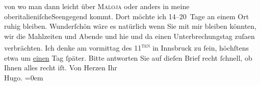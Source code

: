 \begin{ledgroupsized}[t]{13cm}
                    von wo man dann leicht über \textsc{Maloja} oder anders {\pb}in meine oberitalieniſcheSeengegend kommt. Dort möchte ich 14–20 Tage an einem Ort ruhig bleiben.
                    Wunderſchön wäre es natürlich wenn Sie mit mir bleiben könnten, wir die
                    Mahlzeiten und Abende und hie und da einen Unterbrechungstag {\pb}zuſa{\geminationm}en verbrächten.\pend
           \pstart
           Ich denke am vormittag des 11\textsuperscript{\textsc{ten}} in Innsbruck zu ſein, höchſtens etwa um
                        \uline{einen} Tag ſpäter. Bitte antworten Sie auf
                    dieſen Brief recht ſchnell, ob Ihnen alles recht iſt.\pend
           \pstart
           Von Herzen Ihr{\\[\baselineskip]}\spacefill\mbox{Hugo.}\pend
           \leftskip=0em{}\endnumbering{}\end{ledgroupsized}  \newcommand{\dateiname}{L00829}\newcommand{\titel}{Hugo von Hofmannsthal an Arthur Schnitzler, 3. 8. [1898]}\newcommand{\editorInnen}{Martin Anton Müller und Gerd-Hermann Susen}
      